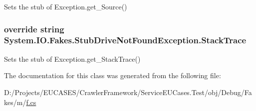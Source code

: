 Sets the stub of Exception.\-get\-\_\-\-Source()

\hypertarget{class_system_1_1_i_o_1_1_fakes_1_1_stub_drive_not_found_exception_a945c538209b77a2aa867f0ce8b03ee4f}{
\subsubsection[{Stack\-Trace}]{\setlength{\rightskip}{0pt plus 5cm}override string System.\-I\-O.\-Fakes.\-Stub\-Drive\-Not\-Found\-Exception.\-Stack\-Trace\hspace{0.3cm}{\ttfamily [get]}}}\label{class_system_1_1_i_o_1_1_fakes_1_1_stub_drive_not_found_exception_a945c538209b77a2aa867f0ce8b03ee4f}


Sets the stub of Exception.\-get\-\_\-\-Stack\-Trace()



The documentation for this class was generated from the following file\-:\begin{DoxyCompactItemize}
\item 
D\-:/\-Projects/\-E\-U\-C\-A\-S\-E\-S/\-Crawler\-Framework/\-Service\-E\-U\-Cases.\-Test/obj/\-Debug/\-Fakes/m/\hyperlink{m_2f_8cs}{f.\-cs}\end{DoxyCompactItemize}
